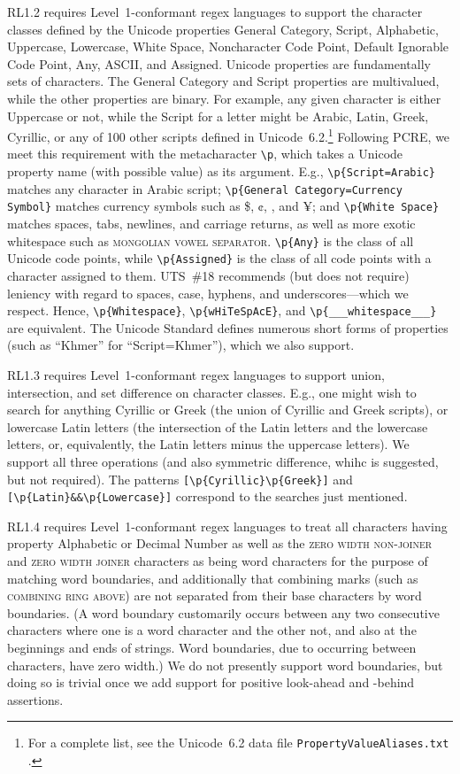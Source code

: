 \documentclass[5p,final,number,sort&compress]{elsarticle}
\newcommand{\re}[1]{\texttt{#1}}
\newcommand*{\whack}{\textbackslash}
\begin{document}
RL1.2 requires Level~1-conformant regex languages to support the character classes defined by the Unicode properties General Category, Script, Alphabetic, Uppercase, Lowercase, White Space, Noncharacter Code Point, Default Ignorable Code Point, Any, ASCII, and Assigned. Unicode properties are fundamentally sets of characters. The General Category and Script properties are multivalued, while the other properties are binary. For example, any given character is either Uppercase or not, while the Script for a letter might be Arabic, Latin, Greek, Cyrillic, or any of 100 other scripts defined in Unicode~6.2.\footnote{For a complete list, see the Unicode~6.2 data file \texttt{PropertyValueAliases.txt} \citep{ustd62}.} Following PCRE, we meet this requirement with the metacharacter \re{\whack p}, which takes a Unicode property name (with possible value) as its argument. E.g., \re{\whack p\{Script=Arabic\}} matches any character in Arabic script; \re{\whack p\{General Category=Currency Symbol\}} matches currency symbols such as \$, ¢, \texteuro, and ¥; and \re{\whack p\{White Space\}} matches spaces, tabs, newlines, and carriage returns, as well as more exotic whitespace such as \textsc{mongolian vowel separator}.  \re{\whack p\{Any\}} is the class of all Unicode code points, while \re{\whack p\{Assigned\}} is the class of all code points with a character assigned to them. UTS~\#18 recommends (but does not require) leniency with regard to spaces, case, hyphens, and underscores---which we respect. Hence, \re{\whack p\{Whitespace\}}, \re{\whack p\{wHiTeSpAcE\}}, and \re{\whack p\{\_\_\_white\;\;\;\;space\_\_\_\}} are equivalent. The Unicode Standard defines numerous short forms of properties (such as ``Khmer'' for ``Script=Khmer''), which we also support.

RL1.3 requires Level~1-conformant regex languages to support union, intersection, and set difference on character classes. E.g., one might wish to search for anything Cyrillic or Greek (the union of Cyrillic and Greek scripts), or lowercase Latin letters (the intersection of the Latin letters and the lowercase letters, or, equivalently, the Latin letters minus the uppercase letters). We support all three operations (and also symmetric difference, whihc is suggested, but not required). The patterns \re{[\whack p\{Cyrillic\}\whack p\{Greek\}]} and \re{[\whack p\{Latin\}\&\&\whack p\{Lowercase\}]} correspond to the searches just mentioned.

RL1.4 requires Level~1-conformant regex languages to treat all characters having property Alphabetic or Decimal Number as well as the \textsc{zero width non-joiner} and \textsc{zero width joiner} characters as being word characters for the purpose of matching word boundaries, and additionally that combining marks (such as \textsc{combining ring above}) are not separated from their base characters by word boundaries. (A word boundary customarily occurs between any two consecutive characters where one is a word character and the other not, and also at the beginnings and ends of strings. Word boundaries, due to occurring between characters, have zero width.) We do not presently support word boundaries, but doing so is trivial once we add support for positive look-ahead and -behind assertions.
\end{document}
